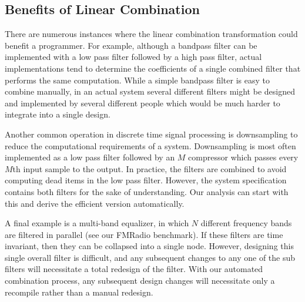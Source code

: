 
\subsection{Benefits of Linear Combination}



There are numerous instances where the linear combination
transformation could benefit a programmer.  For example, although a
bandpass filter can be implemented with a low pass filter followed by
a high pass filter, actual implementations tend to determine the
coefficients of a single combined filter that performs the same
computation. While a simple bandpass filter is easy to combine
manually, in an actual system several different filters might be
designed and implemented by several different people which would be
much harder to integrate into a single design.

Another common operation in discrete time signal processing is
downsampling to reduce the computational requirements of a system.
Downsampling is most often implemented as a low pass filter followed
by an $M$ compressor which passes every $M$th input sample to the
output.  In practice, the filters are combined to avoid computing dead
items in the low pass filter.  However, the system specification
contains both filters for the sake of understanding.  Our analysis can
start with this and derive the efficient version automatically.

A final example is a multi-band equalizer, in which $N$ different
frequency bands are filtered in parallel (see our FMRadio benchmark).
If these filters are time invariant, then they can be collapsed into a
single node.  However, designing this single overall filter is
difficult, and any subsequent changes to any one of the sub filters
will necessitate a total redesign of the filter.  With our automated
combination process, any subsequent design changes will necessitate
only a recompile rather than a manual redesign.

